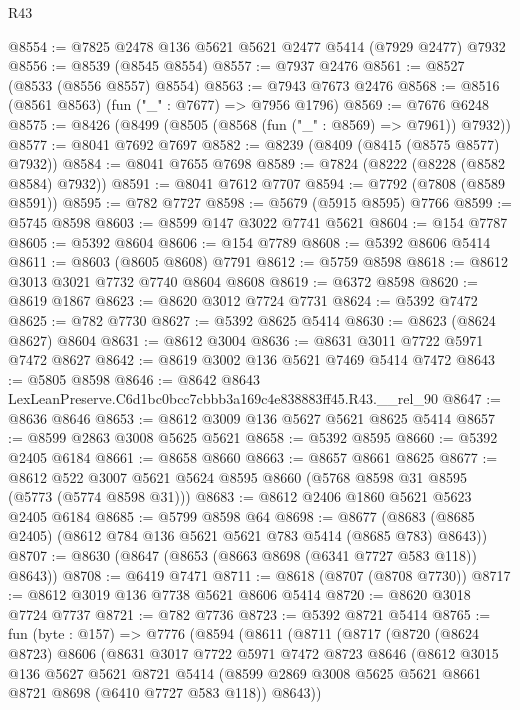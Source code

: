 \begin{lexlean}{R43}
\begin{coremodule}
@8554 := @7825 @2478 @136 @5621 @5621 @2477 @5414 (@7929 @2477) @7932
@8556 := @8539 (@8545 @8554)
@8557 := @7937 @2476
@8561 := @8527 (@8533 (@8556 @8557) @8554)
@8563 := @7943 @7673 @2476
@8568 := @8516 (@8561 @8563) (fun ("_" : @7677) => @7956 @1796)
@8569 := @7676 @6248
@8575 := @8426 (@8499 (@8505 (@8568 (fun ("_" : @8569) => @7961)) @7932))
@8577 := @8041 @7692 @7697
@8582 := @8239 (@8409 (@8415 (@8575 @8577) @7932))
@8584 := @8041 @7655 @7698
@8589 := @7824 (@8222 (@8228 (@8582 @8584) @7932))
@8591 := @8041 @7612 @7707
@8594 := @7792 (@7808 (@8589 @8591))
@8595 := @782 @7727
@8598 := @5679 (@5915 @8595) @7766
@8599 := @5745 @8598
@8603 := @8599 @147 @3022 @7741 @5621
@8604 := @154 @7787
@8605 := @5392 @8604
@8606 := @154 @7789
@8608 := @5392 @8606 @5414
@8611 := @8603 (@8605 @8608) @7791
@8612 := @5759 @8598
@8618 := @8612 @3013 @3021 @7732 @7740 @8604 @8608
@8619 := @6372 @8598
@8620 := @8619 @1867
@8623 := @8620 @3012 @7724 @7731
@8624 := @5392 @7472
@8625 := @782 @7730
@8627 := @5392 @8625 @5414
@8630 := @8623 (@8624 @8627) @8604
@8631 := @8612 @3004
@8636 := @8631 @3011 @7722 @5971 @7472 @8627
@8642 := @8619 @3002 @136 @5621 @7469 @5414 @7472
@8643 := @5805 @8598
@8646 := @8642 @8643 LexLeanPreserve.C6d1bc0bcc7cbbb3a169c4e838883ff45.R43.__rel_90
@8647 := @8636 @8646
@8653 := @8612 @3009 @136 @5627 @5621 @8625 @5414
@8657 := @8599 @2863 @3008 @5625 @5621
@8658 := @5392 @8595
@8660 := @5392 @2405 @6184
@8661 := @8658 @8660
@8663 := @8657 @8661 @8625
@8677 := @8612 @522 @3007 @5621 @5624 @8595 @8660 (@5768 @8598 @31 @8595 (@5773 (@5774 @8598 @31)))
@8683 := @8612 @2406 @1860 @5621 @5623 @2405 @6184
@8685 := @5799 @8598 @64
@8698 := @8677 (@8683 (@8685 @2405) (@8612 @784 @136 @5621 @5621 @783 @5414 (@8685 @783) @8643))
@8707 := @8630 (@8647 (@8653 (@8663 @8698 (@6341 @7727 @583 @118)) @8643))
@8708 := @6419 @7471
@8711 := @8618 (@8707 (@8708 @7730))
@8717 := @8612 @3019 @136 @7738 @5621 @8606 @5414
@8720 := @8620 @3018 @7724 @7737
@8721 := @782 @7736
@8723 := @5392 @8721 @5414
@8765 := fun (byte : @157) =>
  @7776
    (@8594
      (@8611
        (@8711
          (@8717
            (@8720
              (@8624 @8723)
              @8606
              (@8631
                @3017
                @7722
                @5971
                @7472
                @8723
                @8646
                (@8612
                  @3015
                  @136
                  @5627
                  @5621
                  @8721
                  @5414
                  (@8599 @2869 @3008 @5625 @5621 @8661 @8721 @8698 (@6410 @7727 @583 @118))
                  @8643))

\end{coremodule}
\end{lexlean}
